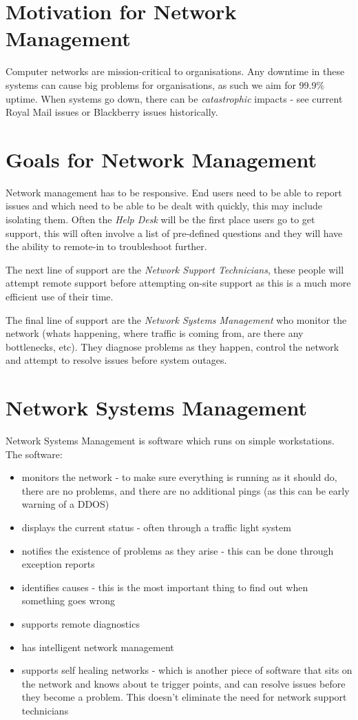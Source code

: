 
\section*{Motivation for Network Management}
Computer networks are mission-critical to organisations. Any downtime in these systems can cause big problems for organisations, as such we aim for 99.9\% uptime. When systems go down, there can be \textit{catastrophic} impacts - see current Royal Mail issues or Blackberry issues historically.

\section*{Goals for Network Management}
Network management has to be responsive. End users need to be able to report issues and which need to be able to be dealt with quickly, this may include isolating them. Often the \textit{Help Desk} will be the first place users go to get support, this will often involve a list of pre-defined questions and they will have the ability to remote-in to troubleshoot further.

The next line of support are the \textit{Network Support Technicians}, these people will attempt remote support before attempting on-site support as this is a much more efficient use of their time.

The final line of support are the \textit{Network Systems Management} who monitor the network (whats happening, where traffic is coming from, are there any bottlenecks, etc). They diagnose problems as they happen, control the network and attempt to resolve issues before system outages. 

\section*{Network Systems Management}
Network Systems Management is software which runs on simple workstations. The software:
\begin{itemize}
    \item monitors the network - to make sure everything is running as it should do, there are no problems, and there are no additional pings (as this can be early warning of a DDOS)
    \item displays the current status - often through a traffic light system
    \item notifies the existence of problems as they arise - this can be done through exception reports
    \item identifies causes - this is the most important thing to find out when something goes wrong
    \item supports remote diagnostics
    \item has intelligent network management
    \item supports self healing networks - which is another piece of software that sits on the network and knows about te trigger points, and can resolve issues before they become a problem. This doesn't eliminate the need for network support technicians
\end{itemize}

